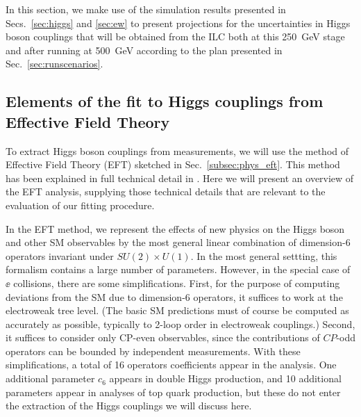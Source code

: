 In this section, we make use of the simulation results presented in
Secs.~\ref{sec:higgs} and \ref{sec:ew} to present projections for the
uncertainties in Higgs boson couplings that will be obtained from the
ILC both at this 250~GeV stage and after running at 500~GeV according
to the plan presented in Sec.~\ref{sec:runscenarios}.   


\subsection{Elements of the fit to Higgs couplings from Effective Field Theory}
\label{subsec:global:elements}



To extract
Higgs boson couplings from measurements, we will use the method of
Effective Field Theory (EFT) sketched in Sec.~\ref{subsec:phys_eft}.
This method has been explained in full technical  detail in
\cite{Barklow:2017suo,Barklow:2017awn}.
Here we will present an overview of the EFT analysis, supplying those 
technical details that are relevant to the evaluation of our fitting procedure.

In the EFT method, we represent the effects of new physics on the
Higgs boson and other SM observables by the most general linear
combination of dimension-6 operators invariant under $SU(2)\times
U(1)$.  In the most general settting, this formalism contains a large
number of parameters.  However, in the special case of $\ee$
collisions, there are some simplifications.   First, for the purpose
of computing deviations from the SM due to dimension-6 operators, it
suffices to work at the electroweak tree level.   (The basic SM
predictions must of course be computed as accurately as possible,
typically to 2-loop order in electroweak couplings.)  Second, it
suffices to consider only CP-even observables, since the 
 contributions of $CP$-odd operators can be bounded
 by independent measurements.   With these simplifications, a total of
 16 operators coefficients appear in the analysis.  One additional
 parameter $c_6$ appears in double Higgs production, and 10 additional
 parameters appear in analyses of top quark production, but these do
 not enter the extraction of the Higgs couplings we will discuss here.

